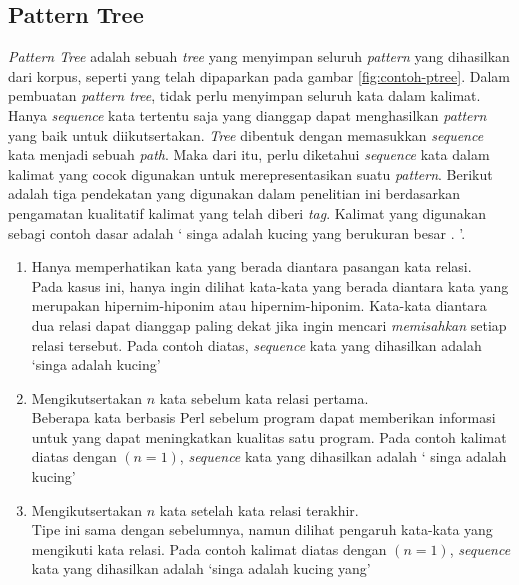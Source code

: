 \subsection{Pattern Tree}
\textit{Pattern Tree} adalah sebuah \textit{tree} yang menyimpan seluruh \textit{pattern} yang dihasilkan dari korpus, seperti yang telah dipaparkan pada gambar \ref{fig:contoh-ptree}. Dalam pembuatan \textit{pattern tree}, tidak perlu menyimpan seluruh kata dalam kalimat. Hanya \textit{sequence} kata tertentu saja yang dianggap dapat menghasilkan \textit{pattern} yang baik untuk diikutsertakan. \textit{Tree} dibentuk dengan memasukkan \textit{sequence} kata menjadi sebuah \textit{path}. Maka dari itu, perlu diketahui \textit{sequence} kata dalam kalimat yang cocok digunakan untuk merepresentasikan suatu \textit{pattern}. Berikut adalah tiga pendekatan yang digunakan dalam penelitian ini berdasarkan pengamatan kualitatif kalimat yang telah diberi \textit{tag}. Kalimat yang digunakan sebagi contoh dasar adalah `{\tagStart} {\tagHyponym}singa{\tagHyponym} adalah {\tagHypernym}kucing{\tagHypernym} yang berukuran besar . {\tagEnd}'.

\begin{enumerate}
  \item Hanya memperhatikan kata yang berada diantara pasangan kata relasi. \\
  Pada kasus ini, hanya ingin dilihat kata-kata yang berada diantara kata yang merupakan hipernim-hiponim atau hipernim-hiponim. Kata-kata diantara dua relasi dapat dianggap paling dekat jika ingin mencari \textit{memisahkan} setiap relasi tersebut. Pada contoh diatas, \textit{sequence} kata yang dihasilkan adalah `{\tagHyponym}singa{\tagHyponym} adalah {\tagHypernym}kucing{\tagHypernym}'
  \item Mengikutsertakan $n$ kata sebelum kata relasi pertama. \\
  Beberapa kata berbasis Perl sebelum program dapat memberikan informasi untuk yang dapat meningkatkan kualitas satu program. Pada contoh kalimat diatas dengan $(n=1)$, \textit{sequence} kata yang dihasilkan adalah `{\tagStart} {\tagHyponym}singa{\tagHyponym} adalah {\tagHypernym}kucing{\tagHypernym}'
  \item Mengikutsertakan $n$ kata setelah kata relasi terakhir. \\
  Tipe ini sama dengan sebelumnya, namun dilihat pengaruh kata-kata yang mengikuti kata relasi. Pada contoh kalimat diatas dengan $(n=1)$, \textit{sequence} kata yang dihasilkan adalah `{\tagHyponym}singa{\tagHyponym} adalah {\tagHypernym}kucing{\tagHypernym} yang'
\end{enumerate}

